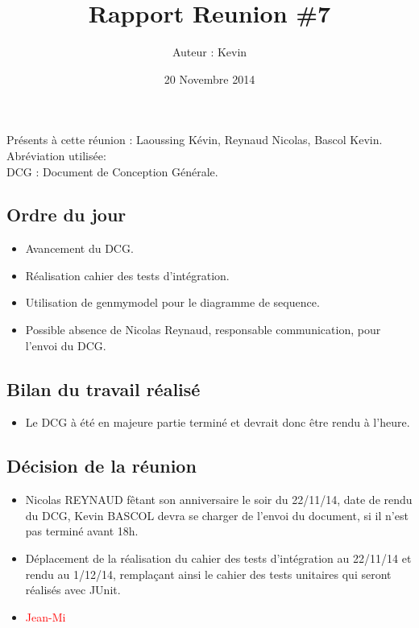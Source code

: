 \documentclass[12pt,a4paper]{article}
\title{Rapport Reunion \#7}
\author{Auteur : Kevin \bsc{BASCOL}}
\date{20 Novembre 2014}
\begin{document}
\maketitle

\newpage

Présents à cette réunion : Laoussing Kévin, Reynaud Nicolas, Bascol Kevin.\\

Abréviation utilisée:\\
DCG : Document de Conception Générale.

\subsection*{Ordre du jour}
\begin{itemize}[label = $\ast$]
\item Avancement du DCG.
\item Réalisation cahier des tests d'intégration.
\item Utilisation de genmymodel pour le diagramme de sequence.
\item Possible absence de Nicolas Reynaud, responsable communication, pour l'envoi du DCG.
\end{itemize}

\subsection*{Bilan du travail réalisé}

\begin{itemize}[label = $\ast$]
\item Le DCG à été en majeure partie terminé et devrait donc être rendu à l'heure.
\end{itemize}


\subsection*{Décision de la réunion}

\begin{itemize}[label = $\ast$]
\item Nicolas REYNAUD fêtant son anniversaire le soir du 22/11/14, date de rendu du DCG, Kevin BASCOL devra se charger de l'envoi du document, si il n'est pas terminé avant 18h.
\item Déplacement de la réalisation du cahier des tests d'intégration au 22/11/14 et rendu au 1/12/14, remplaçant ainsi le cahier des tests unitaires qui seront réalisés avec JUnit.
\item \textcolor{red}{Jean-Mi} 
\end{itemize}
\end{document}
